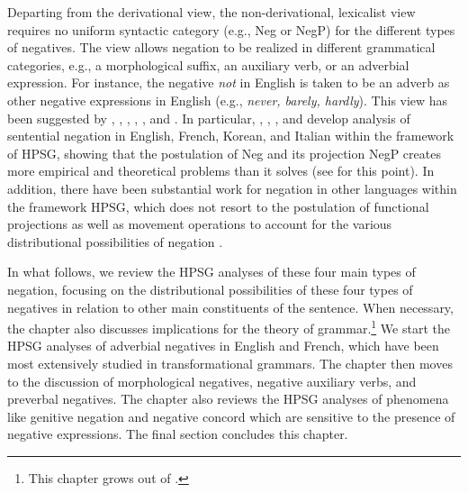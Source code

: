 \documentclass[output=paper
                ,modfonts
                		,nonflat
	        ,collection
	        ,collectionchapter
	        ,collectiontoclongg
 	        ,biblatex
                ,babelshorthands
                ,newtxmath
                ,draftmode
                ,colorlinks, citecolor=brown
]{./langsci/langscibook}
\begin{document}
{Departing from the derivational view, the non-derivational, lexicalist view
requires no uniform syntactic category (e.g., Neg or NegP) for the different types of negatives. The view allows negation to be realized in different grammatical categories, e.g., a morphological suffix, an auxiliary verb, or an adverbial expression. For instance, the negative {\it not} in English is taken to be an adverb as other negative expressions in English (e.g., \textit{never, barely, hardly}). This view has been suggested by \citet{Jackendoff:72}, \citet{Baker:91}, \citet{Ernst:92}, \citet{AG:97}, \citet{Kim:00}, and \citet{Warner2000a-u}. In particular,
\citet{KS:96}, \citet{AG:97}, \citet{Kim:00}, and \citet{KS:02} develop analysis of sentential negation in English, French, Korean, and Italian within the framework of HPSG, showing that the postulation of Neg and its projection NegP creates more empirical and theoretical problems than it solves (see \citet{Newmeyer:2006} for this point).
In addition, there have been substantial work for negation in other languages within the framework HPSG, which
does not resort to the postulation of functional projections as well as movement operations to account for the various distributional possibilities
of negation \citep[see]{PK:99, BJ:00, Prz:00, Kupsc:02, Swart:02, Borsley:05, Crysmann:10, Bender:13}.

In what follows, we review the HPSG analyses of these four main types of negation,
focusing on the distributional possibilities of these four types of negatives in
relation to other main constituents of the sentence. When
necessary, the chapter also discusses implications for
the theory of grammar.\footnote{This chapter grows out of \citet{Kim:00,18}.} We
start the HPSG analyses of adverbial negatives in English and French, which have been most extensively studied in transformational grammars.
The chapter then moves to the discussion of morphological
negatives, negative auxiliary verbs, and preverbal negatives. The chapter
also reviews the HPSG analyses of phenomena like genitive negation and
negative concord which are sensitive to the presence of negative expressions. The
final section concludes this chapter.


}
\end{document}
